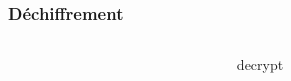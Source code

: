        \begin{frame}
            \frametitle{Déchiffrement}
            \begin{columns}
                \begin{column}{.45\linewidth}
                \end{column}decrypt
                \pause
                \begin{column}{.45\linewidth}
                \end{column}
            \end{columns}
        \end{frame}

